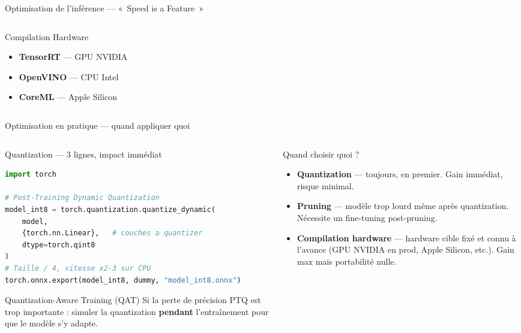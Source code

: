 \documentclass[aspectratio=169, 10pt]{beamer}
\begin{document}
\begin{frame}{Optimisation de l'inférence --- «~Speed is a Feature~»}
\begin{columns}[T]
\begin{column}{0.31\textwidth}
\begin{block}{Compilation Hardware}
\begin{itemize}
          \item \textbf{TensorRT} --- GPU NVIDIA
          \item \textbf{OpenVINO} --- CPU Intel
          \item \textbf{CoreML} --- Apple Silicon
        \end{itemize}
      \end{block}
    \end{column}
  \end{columns}
\end{frame}

\begin{frame}[fragile]{Optimisation en pratique --- quand appliquer quoi}
  \begin{columns}[T]
    \begin{column}{0.52\textwidth}
      \begin{exampleblock}{Quantization --- 3 lignes, impact immédiat}
\begin{lstlisting}[language=Python, basicstyle=\ttfamily\scriptsize, numbers=none]
import torch

# Post-Training Dynamic Quantization
model_int8 = torch.quantization.quantize_dynamic(
    model,
    {torch.nn.Linear},   # couches a quantizer
    dtype=torch.qint8
)
# Taille / 4, vitesse x2-3 sur CPU
torch.onnx.export(model_int8, dummy, "model_int8.onnx")
\end{lstlisting}
      \end{exampleblock}
      \vspace{2pt}
      \begin{alertblock}{Quantization-Aware Training (QAT)}
        Si la perte de précision PTQ est trop importante :
        simuler la quantization \textbf{pendant} l'entraînement
        pour que le modèle s'y adapte.
      \end{alertblock}
    \end{column}
    \begin{column}{0.44\textwidth}
      \begin{block}{Quand choisir quoi ?}
        \begin{itemize}\setlength{\itemsep}{3pt}
          \item \textbf{Quantization} --- toujours, en premier.
                Gain immédiat, risque minimal.
          \item \textbf{Pruning} --- modèle trop lourd
                même après quantization.
                Nécessite un fine-tuning post-pruning.
          \item \textbf{Compilation hardware} ---
                hardware cible fixé et connu à l'avance
                (GPU NVIDIA en prod, Apple Silicon, etc.).
                Gain max mais portabilité nulle.
        \end{itemize}
      \end{block}
    \end{column}
  \end{columns}
\end{frame}
\end{document}
